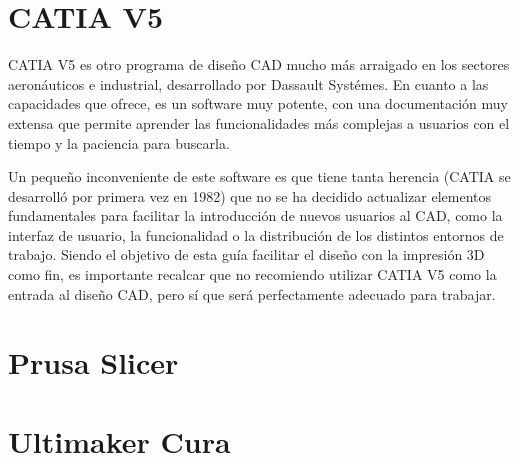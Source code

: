 \section{CATIA V5}
\newcommand{\catia}{CATIA V5 }
\catia es otro programa de diseño CAD mucho más arraigado en los sectores aeronáuticos e industrial, desarrollado por Dassault Systémes. En cuanto a las capacidades que ofrece, es un software muy potente, con una documentación muy extensa que permite aprender las funcionalidades más complejas a usuarios con el tiempo y la paciencia para buscarla. 
\par Un pequeño inconveniente de este software es que tiene tanta herencia (CATIA se desarrolló por primera vez en 1982) que no se ha decidido actualizar elementos fundamentales para facilitar la introducción de nuevos usuarios al CAD, como la interfaz de usuario, la funcionalidad o la distribución de los distintos entornos de trabajo. Siendo el objetivo de esta guía facilitar el diseño con la impresión 3D como fin, es importante recalcar que no recomiendo utilizar \catia como la entrada al diseño CAD, pero sí que será perfectamente adecuado para trabajar. 

\section{Prusa Slicer}

\section{Ultimaker Cura}
